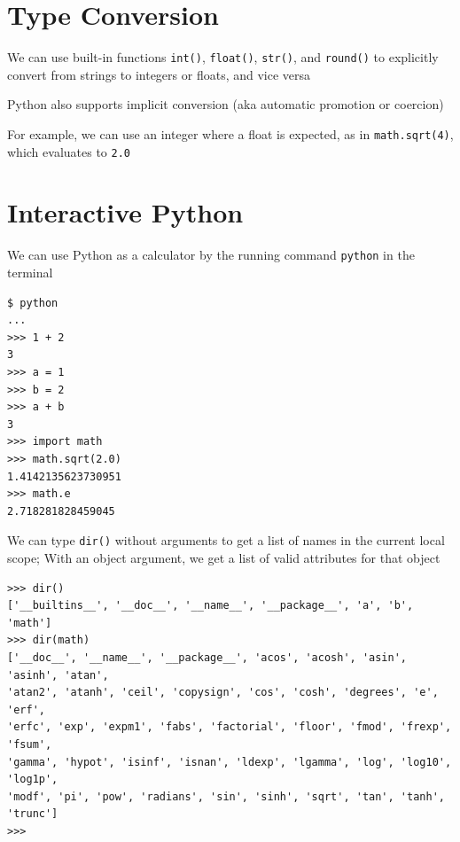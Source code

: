 \documentclass[8pt,a4paper,compress]{beamer}
\begin{document}
\section{Type Conversion}
\begin{frame}[fragile]
\pause

We can use built-in functions \lstinline{int()}, \lstinline{float()}, \lstinline{str()}, and \lstinline{round()} to explicitly convert from strings to integers or floats, and vice versa

\pause
\bigskip

Python also supports implicit conversion (aka automatic promotion or coercion)

\pause
\bigskip

For example, we can use an integer where a float is expected, as in \lstinline{math.sqrt(4)}, which evaluates to \lstinline{2.0}
\end{frame}

\section{Interactive Python}
\begin{frame}[fragile]
\pause

We can use Python as a calculator by the running command \lstinline{python} in the terminal

\begin{lstlisting}[language={}]
$ python
...
>>> 1 + 2
3
>>> a = 1
>>> b = 2
>>> a + b
3
>>> import math
>>> math.sqrt(2.0)
1.4142135623730951
>>> math.e
2.718281828459045
\end{lstlisting}

\pause
\bigskip

We can type \lstinline{dir()} without arguments to get a list of names in the current local scope; With an object argument, we get a list of valid attributes for that object
\begin{lstlisting}[language={}]
>>> dir()
['__builtins__', '__doc__', '__name__', '__package__', 'a', 'b', 'math']
>>> dir(math)
['__doc__', '__name__', '__package__', 'acos', 'acosh', 'asin', 'asinh', 'atan', 
'atan2', 'atanh', 'ceil', 'copysign', 'cos', 'cosh', 'degrees', 'e', 'erf', 
'erfc', 'exp', 'expm1', 'fabs', 'factorial', 'floor', 'fmod', 'frexp', 'fsum', 
'gamma', 'hypot', 'isinf', 'isnan', 'ldexp', 'lgamma', 'log', 'log10', 'log1p', 
'modf', 'pi', 'pow', 'radians', 'sin', 'sinh', 'sqrt', 'tan', 'tanh', 'trunc']
>>> 
\end{lstlisting}
\end{frame}
\end{document}
